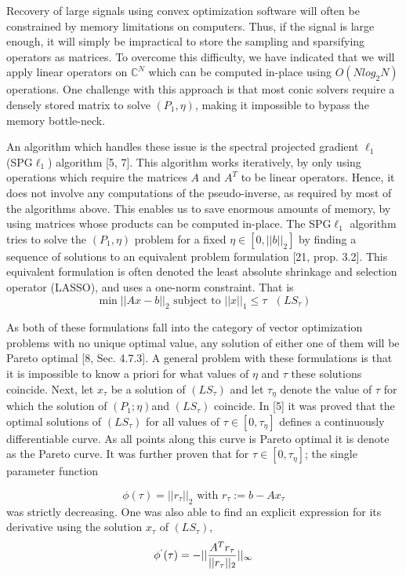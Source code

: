 \documentclass{article}
\begin{document}
Recovery of large signals using convex optimization software will often be constrained by memory limitations on computers. Thus, if the signal is large enough, it will simply be impractical to store the sampling and sparsifying
operators as matrices. To overcome this difficulty, we have indicated that we will apply linear operators on $\mathbb{C}^N$ which can be computed in-place using $O (N log_2 N)$ operations. One challenge with this approach is that most conic solvers require a densely stored matrix to solve $(P_1, \eta)$, making it impossible to bypass the memory bottle-neck.

An algorithm which handles these issue is the spectral projected gradient $\ell_1$  (SPG$\ell_1$) algorithm [5, 7]. This algorithm works iteratively, by only using operations which require the matrices $A$ and $A^T$ to be linear operators. Hence, it does not involve any computations of the pseudo-inverse, as required by most of the algorithms above. This enables us to save enormous amounts of memory, by using matrices whose products can be computed in-place.
The SPG$\ell_1$ algorithm tries to solve the $(P_1, \eta)$ problem for a fixed $\eta \in [0,||b||_2]$
by finding a sequence of solutions to an equivalent problem formulation [21, prop. 3.2]. This equivalent formulation is often denoted the least absolute shrinkage and selection operator (LASSO), and uses a one-norm constraint. That is 
\begin{equation}
\min ||Ax-b||_2 \text{ subject to } ||x||_1 \leq \tau  \text{   }     (LS_{\tau})  
\end{equation}

As both of these formulations fall into the category of vector optimization
problems with no unique optimal value, any solution of either one of them will
be Pareto optimal [8, Sec. 4.7.3]. A general problem with these formulations is
that it is impossible to know a priori for what values of $\eta$ and $\tau$ these solutions
coincide.
Next, let $x_{\tau}$ be a solution of $(LS_{\tau})$ and let $\tau_{\eta}$ denote the value of $\tau$ for which the solution of $(P_1; \eta)$and $(LS_{\tau})$ coincide. In [5] it was proved that the
optimal solutions of  $(LS_{\tau})$  for all values of $\tau \in [0,\tau_{\eta}]$ defines a continuously differentiable curve. As all points along this curve is Pareto optimal it is
denote as the Pareto curve. It was further proven that for $\tau \in [0,\tau_{\eta}] $;  the single
parameter function

\begin{equation}
    \phi (\tau) = ||r_{\tau}||_2 \text{ with } r_ {\tau}:= b - Ax_{\tau}   
\end{equation}
was strictly decreasing. One was also able to find an explicit expression for its
derivative using the solution $x_{\tau}$ of $(LS_{\tau})$,
\begin{equation}
    \phi^{`} (\tau) = -||\frac{A^T r_{\tau}}{||r_{\tau}||_2}||_{\infty}
\end{equation}
\end{document}

